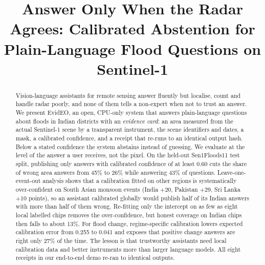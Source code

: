 \documentclass[conference]{IEEEtran}
\begin{document}
\title{Answer Only When the Radar Agrees: Calibrated Abstention for Plain-Language Flood Questions on Sentinel-1}

\author{
}

\maketitle

\begin{abstract}
Vision-language assistants for remote sensing answer fluently but localise, count and handle radar poorly, and none of them tells a non-expert when not to trust an answer. We present EvidEO, an open, CPU-only system that answers plain-language questions about floods in Indian districts with an \emph{evidence card}: an area measured from the actual Sentinel-1 scene by a transparent instrument, the scene identifiers and dates, a mask, a calibrated confidence, and a receipt that re-runs to an identical output hash. Below a stated confidence the system abstains instead of guessing. We evaluate at the level of the answer a user receives, not the pixel. On the held-out Sen1Floods11 test split, publishing only answers with calibrated confidence of at least 0.60 cuts the share of wrong area answers from 45\% to 26\% while answering 43\% of questions. Leave-one-event-out analysis shows that a calibration fitted on other regions is systematically over-confident on South Asian monsoon events (India $+20$, Pakistan $+29$, Sri Lanka $+10$ points), so an assistant calibrated globally would publish half of its Indian answers with more than half of them wrong. Re-fitting only the intercept on as few as eight local labelled chips removes the over-confidence, but honest coverage on Indian chips then falls to about 13\%. For flood change, regime-specific calibration lowers expected calibration error from 0.255 to 0.041 and exposes that positive change answers are right only 27\% of the time. The lesson is that trustworthy assistants need local calibration data and better instruments more than larger language models. All eight receipts in our end-to-end demo re-ran to identical outputs.
\end{abstract}
\end{document}

